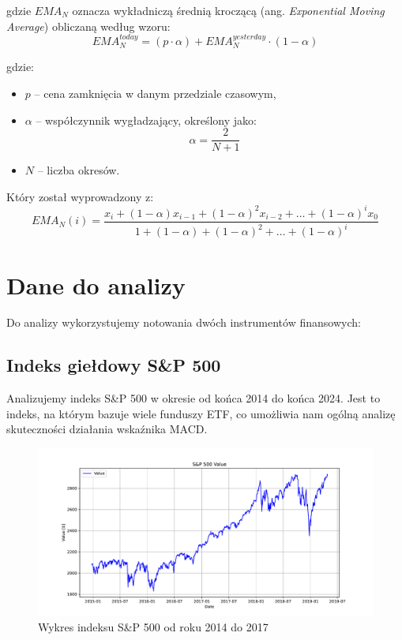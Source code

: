 \documentclass[12pt, letterpaper]{article}
\begin{document}
gdzie $EMA_N$ oznacza wykładniczą średnią kroczącą (ang. \textit{Exponential Moving Average}) obliczaną według wzoru:
\begin{equation}
    EMA_N^{today} = (p \cdot \alpha) + EMA_N^{yesterday} \cdot (1 - \alpha)
\end{equation}

gdzie:
\begin{itemize}
    \item $p$ – cena zamknięcia w danym przedziale czasowym,
    \item $\alpha$ – współczynnik wygładzający, określony jako:
    \begin{equation}
        \alpha = \frac{2}{N+1}
    \end{equation}
    \item $N$ – liczba okresów.
\end{itemize}

Który został wyprowadzony z:
\begin{equation}
    EMA_N(i) = \frac{x_i + (1 - \alpha)x_{i-1} + (1 - \alpha)^2 x_{i-2} + \dots + (1 - \alpha)^i x_0}
    {1 + (1 - \alpha) + (1 - \alpha)^2 + \dots + (1 - \alpha)^i}
\end{equation}

\section{Dane do analizy}

Do analizy wykorzystujemy notowania dwóch instrumentów finansowych:

\subsection{Indeks giełdowy S\&P 500}
Analizujemy indeks S\&P 500 w okresie od końca 2014 do końca 2024. Jest to indeks, na którym bazuje wiele funduszy ETF, co umożliwia nam ogólną analizę skuteczności działania wskaźnika MACD. 

\begin{figure}[h!]
    \centering
    \includegraphics[width=\linewidth]{wykres S&P 500 from 0.pdf}
    \caption{Wykres indeksu S\&P 500 od roku 2014 do 2017}
    \label{fig:sp500_2014_2017}
\end{figure}
\end{document}
